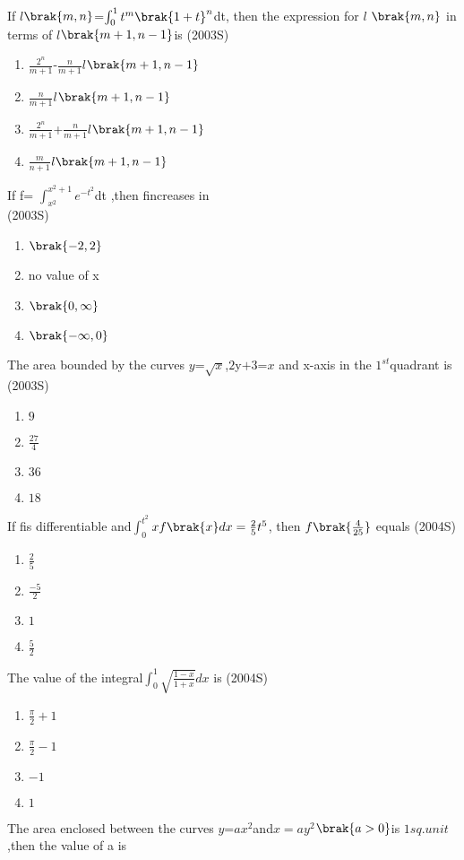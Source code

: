 \iffalse                                         
\title{Assignment}
\author{AI24BTECH11006}
\section{mcq-single}
\fi
\item If $l$$\brak{m,n}$=$\int_{0}^{1}t^m\brak{1+t}^n$dt, then the expression for $l$ $\brak{m,n}$ in terms of $l$$\brak{m+1,n-1}$is
\hfill{(2003S)}
\begin{enumerate}
\item $\frac{2^n}{m+1}$-$\frac{n}{m+1}$$l$$\brak{m+1,n-1}$
\item $\frac{n}{m+1}$$l$$\brak{m+1,n-1}$
\item $\frac{2^n}{m+1}$+$\frac{n}{m+1}$$l$$\brak{m+1,n-1}$
\item $\frac{m}{n+1}$$l\brak{m+1,n-1}$
\end{enumerate}
\item If f= $\int_{x^2}^{x^2+1}e^{-t^2}$dt ,then fincreases in\\
\hfill{(2003S)}
\begin{enumerate}
\item  $\brak{-2,2}$
\item no value of x
\item  $\brak{0,\infty}$
\item  $\brak{-\infty,0}$
\end{enumerate}
\item The area bounded by the curves  $y$=$\sqrt{x}$,$2$y$+3$=$x$ and x-axis in the $1^{st}$quadrant is
\hfill{(2003S)}
\begin{enumerate}
\item $9$
\item$\frac{27}{4}$
\item $36$
\item $18$
\end{enumerate}
\item If fis differentiable and$\int_{0}^{t^2}$$xf\brak{x}dx=\frac{2}{5}t^5$, then $f\brak{\frac{4}{25}}$ equals
\hfill{(2004S)}
\begin{enumerate}
\item $\frac{2}{5}$
\item $\frac{-5}{2}$
\item  $1$
\item $\frac{5}{2}$
\end{enumerate}
\item The value of the integral$\int_{0}^{1}\sqrt{\frac{1-x}{1+x}}dx$ is
\hfill{(2004S)}
\begin{enumerate}
\item$\frac{\pi}{2}+1$
\item$\frac{\pi}{2}-1$
\item$-1$
\item$1$
\end{enumerate}
\item The area enclosed between the curves 
$y$=$ax^2$and$x=ay^2$$\brak{a>0}$is $1 sq.unit$,then the value of a is
